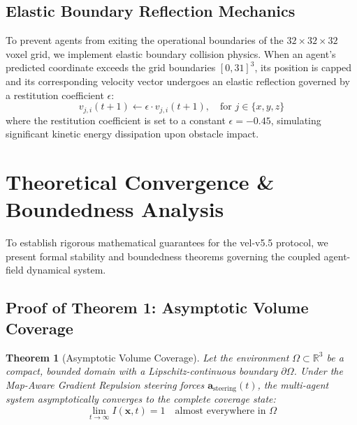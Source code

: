 \documentclass[letterpaper, 10pt, conference]{IEEEtran}
\newtheorem{theorem}{Theorem}
\begin{document}
\subsection{Elastic Boundary Reflection Mechanics}
To prevent agents from exiting the operational boundaries of the $32 \times 32 \times 32$ voxel grid, we implement elastic boundary collision physics. When an agent's predicted coordinate exceeds the grid boundaries $[0, 31]^3$, its position is capped and its corresponding velocity vector undergoes an elastic reflection governed by a restitution coefficient $\epsilon$:
\begin{equation}
    v_{j,i}(t+1) \leftarrow \epsilon \cdot v_{j,i}(t+1), \quad \text{for } j \in \{x, y, z\}
    \label{eq:restitution}
\end{equation}
where the restitution coefficient is set to a constant $\epsilon = -0.45$, simulating significant kinetic energy dissipation upon obstacle impact.

\section{Theoretical Convergence \& Boundedness Analysis}
\label{sec:theory}

To establish rigorous mathematical guarantees for the vel-v5.5 protocol, we present formal stability and boundedness theorems governing the coupled agent-field dynamical system.

\subsection{Proof of Theorem 1: Asymptotic Volume Coverage}
\begin{theorem}[Asymptotic Volume Coverage]
Let the environment $\Omega \subset \mathbb{R}^3$ be a compact, bounded domain with a Lipschitz-continuous boundary $\partial\Omega$. Under the Map-Aware Gradient Repulsion steering forces $\mathbf{a}_{\text{steering}}(t)$, the multi-agent system asymptotically converges to the complete coverage state:
\begin{equation}
    \lim_{t \to \infty} I(\mathbf{x}, t) = 1 \quad \text{almost everywhere in } \Omega
\end{equation}
\end{theorem}
\end{document}
